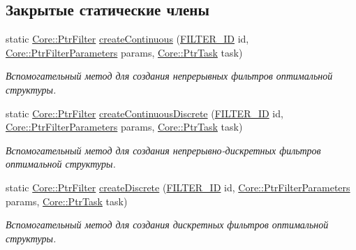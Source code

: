 \subsection*{Закрытые статические члены}
\begin{DoxyCompactItemize}
\item 
\hypertarget{class_filters_1_1_filter_factory_a0c5ef077dc893e280e0fe63a42d7d84f}{}\label{class_filters_1_1_filter_factory_a0c5ef077dc893e280e0fe63a42d7d84f} 
static \hyperlink{namespace_core_afba80c2cb714c7d5793d9bcb9591e156}{Core\+::\+Ptr\+Filter} \hyperlink{class_filters_1_1_filter_factory_a0c5ef077dc893e280e0fe63a42d7d84f}{create\+Continuous} (\hyperlink{namespace_filters_a1b615faac44ef992d0af44da40ff26d7}{F\+I\+L\+T\+E\+R\+\_\+\+ID} id, \hyperlink{namespace_core_a4811af8148ba137d644b9a61a042cf03}{Core\+::\+Ptr\+Filter\+Parameters} params, \hyperlink{namespace_core_abfda8f69fcacfcea2696549b548ed737}{Core\+::\+Ptr\+Task} task)
\begin{DoxyCompactList}\small\item\em Вспомогательный метод для создания непрерывных фильтров оптимальной структуры. \end{DoxyCompactList}\item 
\hypertarget{class_filters_1_1_filter_factory_a0db9538bb9f4cf762c382a9a264d67d9}{}\label{class_filters_1_1_filter_factory_a0db9538bb9f4cf762c382a9a264d67d9} 
static \hyperlink{namespace_core_afba80c2cb714c7d5793d9bcb9591e156}{Core\+::\+Ptr\+Filter} \hyperlink{class_filters_1_1_filter_factory_a0db9538bb9f4cf762c382a9a264d67d9}{create\+Continuous\+Discrete} (\hyperlink{namespace_filters_a1b615faac44ef992d0af44da40ff26d7}{F\+I\+L\+T\+E\+R\+\_\+\+ID} id, \hyperlink{namespace_core_a4811af8148ba137d644b9a61a042cf03}{Core\+::\+Ptr\+Filter\+Parameters} params, \hyperlink{namespace_core_abfda8f69fcacfcea2696549b548ed737}{Core\+::\+Ptr\+Task} task)
\begin{DoxyCompactList}\small\item\em Вспомогательный метод для создания непрерывно-\/дискретных фильтров оптимальной структуры. \end{DoxyCompactList}\item 
\hypertarget{class_filters_1_1_filter_factory_a2afeb17c3cb614d3319feac10ccdcfa9}{}\label{class_filters_1_1_filter_factory_a2afeb17c3cb614d3319feac10ccdcfa9} 
static \hyperlink{namespace_core_afba80c2cb714c7d5793d9bcb9591e156}{Core\+::\+Ptr\+Filter} \hyperlink{class_filters_1_1_filter_factory_a2afeb17c3cb614d3319feac10ccdcfa9}{create\+Discrete} (\hyperlink{namespace_filters_a1b615faac44ef992d0af44da40ff26d7}{F\+I\+L\+T\+E\+R\+\_\+\+ID} id, \hyperlink{namespace_core_a4811af8148ba137d644b9a61a042cf03}{Core\+::\+Ptr\+Filter\+Parameters} params, \hyperlink{namespace_core_abfda8f69fcacfcea2696549b548ed737}{Core\+::\+Ptr\+Task} task)
\begin{DoxyCompactList}\small\item\em Вспомогательный метод для создания дискретных фильтров оптимальной структуры. \end{DoxyCompactList}\end{DoxyCompactItemize}


